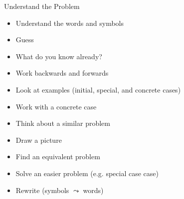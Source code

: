 \begin{frame}{Understand the Problem}

		\begin{itemize}
					
						\item Understand the words and symbols
						
						\item Guess
						
						\item What do you know already?
						
						\item Work backwards and forwards
						
						\item Look at examples (initial, special, and concrete cases)
						
						\item Work with a concrete case
						
						\item Think about a similar problem
						
						\item Draw a picture
						
						\item Find an equivalent problem
						
						\item Solve an easier problem (e.g. special case case)
						
						\item Rewrite (symbols  $\leadsto$ words)
					
					\end{itemize}

\end{frame}

